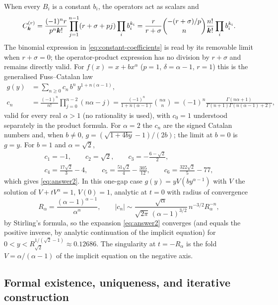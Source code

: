 When every $B_i$ is a constant $b_i$, the operators act as scalars and
\begin{equation}
 C^{(r)}_{\boldsymbol k}=\frac{(-1)^nr}{p^n\boldsymbol k!}\prod_{j=1}^{n-1}(r+\sigma+pj)\prod_ib_i^{k_i}
 =\frac{r}{r+\sigma}\binom{-(r+\sigma)/p}{n}\frac{n!}{\boldsymbol k!}\prod_ib_i^{k_i}.
 \label{eq:constant-coefficients}
\end{equation}
The binomial expression in \eqref{eq:constant-coefficients} is read by its removable limit when $r+\sigma=0$; the operator-product expression has no division by $r+\sigma$ and remains directly valid. For $f(x)=x+bx^\alpha$ ($p=1$, $\delta=\alpha-1$, $r=1$) this is the generalised Fuss--Catalan law
\begin{equation}
\begin{aligned}
 g(y)&=\sum_{n\ge0}c_n\,b^n\,y^{1+n(\alpha-1)},\\
 c_n&=\frac{(-1)^n}{n!}\prod_{j=0}^{n-2}(n\alpha-j)=\frac{(-1)^n}{1+n(\alpha-1)}\binom{n\alpha}{n}=(-1)^n\frac{\Gamma(n\alpha+1)}{\Gamma(n+1)\Gamma(n(\alpha-1)+2)},
\end{aligned}
 \label{eq:fuss-catalan}
\end{equation}
valid for every real $\alpha>1$ (no rationality is used), with $c_0=1$ understood separately in the product formula. For $\alpha=2$ the $c_n$ are the signed Catalan numbers and, when $b\ne0$, $g=(\sqrt{1+4by}-1)/(2b)$; the limit at $b=0$ is $g=y$. For $b=1$ and $\alpha=\sqrt2$,
\begin{gather*}
 c_1=-1,\qquad c_2=\sqrt2,\qquad c_3=-\frac{6-\sqrt2}{2},\\
 c_4=\frac{17\sqrt2}{3}-4,\qquad c_5=\frac{51\sqrt2}{4}-\frac{305}{12},\qquad c_6=\frac{322\sqrt2}{5}-77,
\end{gather*}
which gives \eqref{eq:answer2}. In this one-gap case $g(y)=yV(by^{\alpha-1})$ with $V$ the solution of $V+tV^\alpha=1$, $V(0)=1$, analytic at $t=0$ with radius of convergence
\begin{equation}
 R_\alpha=\frac{(\alpha-1)^{\alpha-1}}{\alpha^\alpha},\qquad |c_n|\sim\frac{\sqrt\alpha}{\sqrt{2\pi}\,(\alpha-1)^{3/2}}\,n^{-3/2}R_\alpha^{-n},
 \label{eq:radius}
\end{equation}
by Stirling's formula, so the expansion \eqref{eq:answer2} converges (and equals the positive inverse, by analytic continuation of the implicit equation) for $0<y<R_{\sqrt2}^{1/(\sqrt2-1)}\approx0.12686$. The singularity at $t=-R_\alpha$ is the fold $V=\alpha/(\alpha-1)$ of the implicit equation on the negative axis.

\subsection{Formal existence, uniqueness, and iterative construction}
\label{sec:formal}

